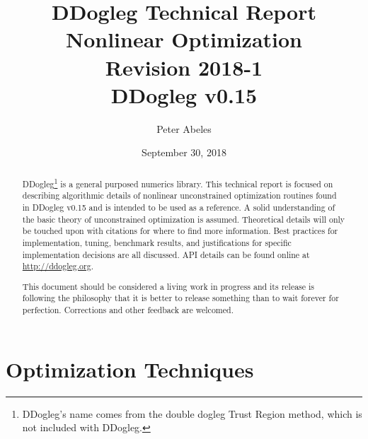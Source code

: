 \documentclass[peerreview,compsoc,onecolumn]{IEEEtran}
\begin{document}
\title{DDogleg Technical Report\\ Nonlinear Optimization\\{\Large Revision 2018-1}\\{\footnotesize DDogleg v0.15}}


\author{Peter Abeles}
\date{September 30, 2018}

\maketitle
\tableofcontents
\listoffigures
\listoftables

\IEEEpeerreviewmaketitle
\begin{abstract}
DDogleg\footnote{DDogleg's name comes from the double dogleg Trust Region method, which is not included with DDogleg.} is a general purposed numerics library. This technical report is focused on describing algorithmic details of nonlinear unconstrained optimization routines found in DDogleg v0.15 and is intended to be used as a reference. A solid understanding of the basic theory of unconstrained optimization is assumed. Theoretical details will only be touched upon with citations for where to find more information. Best practices for implementation, tuning, benchmark results, and justifications for specific implementation decisions are all discussed. API details can be found online at \url{http://ddogleg.org}.

This document should be considered a living work in progress and its release is following the philosophy that it is better to release something than to wait forever for perfection. Corrections and other feedback are welcomed.
\end{abstract}


\section{Optimization Techniques}
\end{document}
